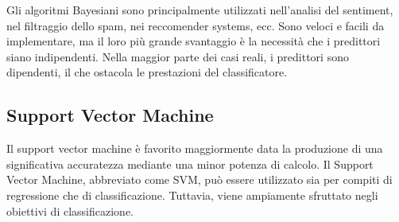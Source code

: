 Gli algoritmi Bayesiani sono principalmente utilizzati nell'analisi del sentiment, nel filtraggio dello spam, nei reccomender systems, ecc. 
Sono veloci e facili da implementare, ma il loro più grande svantaggio è la necessità che i predittori siano indipendenti. 
Nella maggior parte dei casi reali, i predittori sono dipendenti, il che ostacola le prestazioni del classificatore.




\subsection{Support Vector Machine}
Il support vector machine è favorito maggiormente data la produzione di una significativa accuratezza mediante una minor potenza di calcolo. 
Il Support Vector Machine, abbreviato come SVM, può essere utilizzato sia per compiti di regressione che di classificazione. Tuttavia, viene ampiamente sfruttato negli obiettivi di classificazione.

